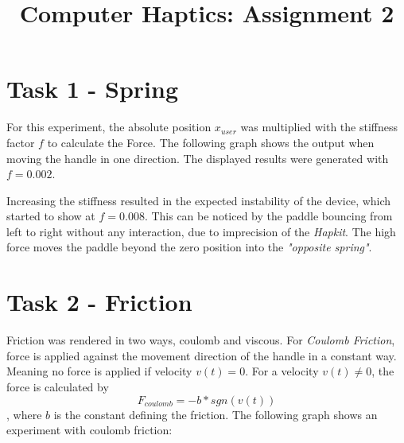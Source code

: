 



  \title{Computer Haptics: Assignment 2}
  \maketitle

  \section*{Task 1 - Spring}

  For this experiment, the absolute position $x_{user}$ was multiplied with the stiffness factor $f$ to calculate the Force. The following graph shows the output when moving the handle in one direction. The displayed results were generated with $f = 0.002$.

  \begin{figure}[H]
    \centering
  \end{figure}

  Increasing the stiffness resulted in the expected instability of the device, which started to show at $f = 0.008$. This can be noticed by the paddle bouncing from left to right without any interaction, due to imprecision of the \textit{Hapkit}. The high force moves the paddle beyond the zero position into the \textit{"opposite spring"}.

  \section*{Task 2 - Friction}

  Friction was rendered in two ways, coulomb and viscous. For \textit{Coulomb Friction}, force is applied against the movement direction of the handle in a constant way. Meaning no force is applied if velocity $v(t) = 0$. For a velocity $v(t) \neq 0$, the force is calculated by
  \begin{equation*}
    F_{coulomb} = -b * sgn(v(t))
  \end{equation*},
  where $b$ is the constant defining the friction. The following graph shows an experiment with coulomb friction:

